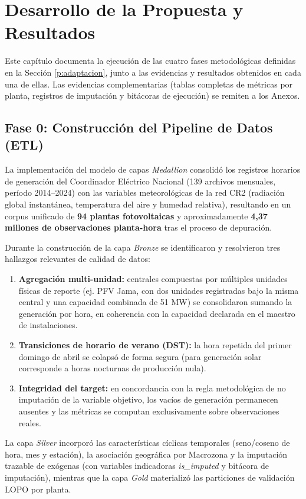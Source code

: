 \section{Desarrollo de la Propuesta y Resultados}

Este capítulo documenta la ejecución de las cuatro fases metodológicas definidas en la Sección \ref{p:adaptacion}, junto a las evidencias y resultados obtenidos en cada una de ellas. Las evidencias complementarias (tablas completas de métricas por planta, registros de imputación y bitácoras de ejecución) se remiten a los Anexos.

\subsection{Fase 0: Construcción del Pipeline de Datos (ETL)}
La implementación del modelo de capas \textit{Medallion} consolidó los registros horarios de generación del Coordinador Eléctrico Nacional (139 archivos mensuales, período 2014--2024) con las variables meteorológicas de la red CR2 (radiación global instantánea, temperatura del aire y humedad relativa), resultando en un corpus unificado de \textbf{94 plantas fotovoltaicas} y aproximadamente \textbf{4,37 millones de observaciones planta-hora} tras el proceso de depuración.

Durante la construcción de la capa \textit{Bronze} se identificaron y resolvieron tres hallazgos relevantes de calidad de datos:
\begin{enumerate}
    \item \textbf{Agregación multi-unidad:} centrales compuestas por múltiples unidades físicas de reporte (ej. PFV Jama, con dos unidades registradas bajo la misma central y una capacidad combinada de 51 MW) se consolidaron sumando la generación por hora, en coherencia con la capacidad declarada en el maestro de instalaciones.
    \item \textbf{Transiciones de horario de verano (DST):} la hora repetida del primer domingo de abril se colapsó de forma segura (para generación solar corresponde a horas nocturnas de producción nula).
    \item \textbf{Integridad del target:} en concordancia con la regla metodológica de no imputación de la variable objetivo, los vacíos de generación permanecen ausentes y las métricas se computan exclusivamente sobre observaciones reales.
\end{enumerate}

La capa \textit{Silver} incorporó las características cíclicas temporales (seno/coseno de hora, mes y estación), la asociación geográfica por Macrozona y la imputación trazable de exógenas (con variables indicadoras \textit{is\_imputed} y bitácora de imputación), mientras que la capa \textit{Gold} materializó las particiones de validación LOPO por planta.

